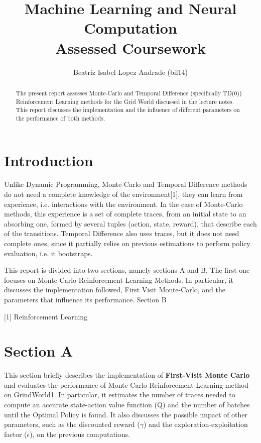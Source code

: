 \documentclass[11pt]{article}   	%
\title{
	Machine Learning and Neural Computation\\
	\textbf{Assessed Coursework}
 }
\author{
	Beatriz Isabel Lopez Andrade (bil14)
}
\begin{document}
\maketitle
\begin{abstract}
The present report assesses Monte-Carlo and Temporal Difference (specifically TD(0)) Reinforcement Learning methods for the Grid World discussed in the lecture notes. This report discusses the implementation and the influence of different parameters on the performance of both methods.
\end{abstract}

\section*{Introduction}
Unlike Dynamic Programming, Monte-Carlo and Temporal Difference methods do not need a complete knowledge of the environment[1], they can learn from experience, i.e. interactions with the environment. In the case of Monte-Carlo methods, this experience is a set of complete traces, from an initial state to an absorbing one, formed by several tuples (action, state, reward), that describe each of the transitions. Temporal Difference also uses traces, but it does not need complete ones, since it partially relies on previous estimations to perform policy evaluation, i.e. it bootstraps.

This report is divided into two sections, namely sections A and B. The first one focuses on Monte-Carlo Reinforcement Learning Methods. In particular, it discusses the implementation followed, First Visit Monte-Carlo, and the parameters that influence its performance. Section B 


[1] Reinforcement Learning

\section*{Section A}

This section briefly describes the implementation of \textbf{First-Visit Monte Carlo} and evaluates the performance of Monte-Carlo Reinforcement Learning method on GrindWorld1. In particular, it estimates the number of traces needed to compute an accurate state-action value function (Q) and the number of batches until the Optimal Policy is found. It also discusses the possible impact of other parameters, such as the discounted reward ($\gamma$) and the exploration-exploitation factor ($\epsilon$), on the previous computations.
\end{document}
